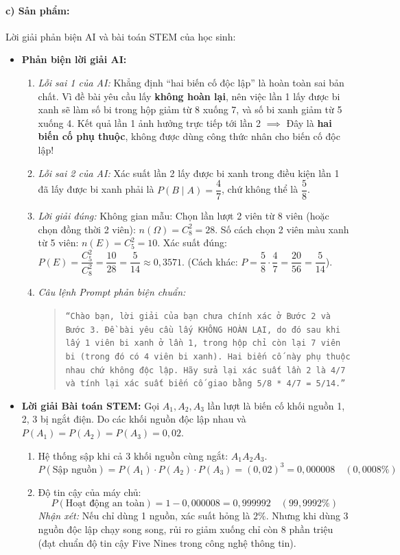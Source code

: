 \documentclass[12pt, a4paper]{article}
\begin{document}
\paragraph{c) Sản phẩm:} Lời giải phản biện AI và bài toán STEM của học sinh:
\begin{itemize}[leftmargin=0.8cm]
    \item \textbf{Phản biện lời giải AI:}
    \begin{enumerate}[leftmargin=0.4cm]
        \item \textit{Lỗi sai 1 của AI:} Khẳng định ``hai biến cố độc lập'' là hoàn toàn sai bản chất. Vì đề bài yêu cầu lấy \textbf{không hoàn lại}, nên việc lần 1 lấy được bi xanh sẽ làm số bi trong hộp giảm từ 8 xuống 7, và số bi xanh giảm từ 5 xuống 4. Kết quả lần 1 ảnh hưởng trực tiếp tới lần 2 $\implies$ Đây là \textbf{hai biến cố phụ thuộc}, không được dùng công thức nhân cho biến cố độc lập!
        \item \textit{Lỗi sai 2 của AI:} Xác suất lần 2 lấy được bi xanh trong điều kiện lần 1 đã lấy được bi xanh phải là $P(B \mid A) = \dfrac{4}{7}$, chứ không thể là $\dfrac{5}{8}$.
        \item \textit{Lời giải đúng:}
        Không gian mẫu: Chọn lần lượt 2 viên từ 8 viên (hoặc chọn đồng thời 2 viên): $n(\Omega) = C_8^2 = 28$.
        Số cách chọn 2 viên màu xanh từ 5 viên: $n(E) = C_5^2 = 10$.
        Xác suất đúng: $P(E) = \dfrac{C_5^2}{C_8^2} = \dfrac{10}{28} = \dfrac{5}{14} \approx 0{,}3571$.
        (Cách khác: $P = \dfrac{5}{8} \cdot \dfrac{4}{7} = \dfrac{20}{56} = \dfrac{5}{14}$).
        \item \textit{Câu lệnh Prompt phản biện chuẩn:}
        \begin{quote}
            \small
            \texttt{``Chào bạn, lời giải của bạn chưa chính xác ở Bước 2 và Bước 3. Đề bài yêu cầu lấy KHÔNG HOÀN LẠI, do đó sau khi lấy 1 viên bi xanh ở lần 1, trong hộp chỉ còn lại 7 viên bi (trong đó có 4 viên bi xanh). Hai biến cố này phụ thuộc nhau chứ không độc lập. Hãy sửa lại xác suất lần 2 là 4/7 và tính lại xác suất biến cố giao bằng 5/8 * 4/7 = 5/14.''}
        \end{quote}
    \end{enumerate}

    \item \textbf{Lời giải Bài toán STEM:}
    Gọi $A_1, A_2, A_3$ lần lượt là biến cố khối nguồn 1, 2, 3 bị ngắt điện.
    Do các khối nguồn độc lập nhau và $P(A_1) = P(A_2) = P(A_3) = 0{,}02$.
    \begin{enumerate}[leftmargin=0.4cm]
        \item Hệ thống sập khi cả 3 khối nguồn cùng ngắt: $A_1 A_2 A_3$.
        $$P(\text{Sập nguồn}) = P(A_1) \cdot P(A_2) \cdot P(A_3) = (0{,}02)^3 = 0{,}000008 \quad (0{,}0008\%)$$
        \item Độ tin cậy của máy chủ:
        $$P(\text{Hoạt động an toàn}) = 1 - 0{,}000008 = 0{,}999992 \quad (99{,}9992\%)$$
        \textit{Nhận xét:} Nếu chỉ dùng 1 nguồn, xác suất hỏng là $2\%$. Nhưng khi dùng 3 nguồn độc lập chạy song song, rủi ro giảm xuống chỉ còn 8 phần triệu (đạt chuẩn độ tin cậy Five Nines trong công nghệ thông tin).
    \end{enumerate}
\end{itemize}
\end{document}
